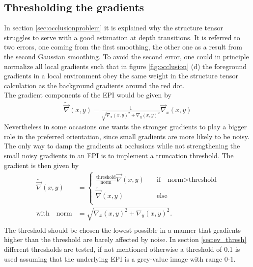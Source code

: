 \documentclass  [
  paper    = a4,
  BCOR     = 10mm,
  twoside,
  fontsize = 12pt,
  fleqn,
  toc      = bibnumbered,
  toc      = listofnumbered,
  numbers  = noendperiod,
  headings = normal,
  listof   = leveldown,
  version  = 3.03
]                                       {scrreprt}
\begin{document}
 \subsection{Thresholding the gradients}
 \label{sec:thresholdinggradients}
 In section \ref{sec:occlusionproblem} it is explained why the structure tensor struggles to serve with a  good estimation at depth transitions. It is referred to two errors, one coming from the first smoothing, the other one as a result from the second Gaussian smoothing. To avoid the second error, one could in principle normalize all local gradients such that in figure \ref{fig:occlusion} (d) the foreground gradients in a local environment obey the same weight in the structure tensor calculation as the background gradients around the red dot.\\
 The gradient components of the EPI would be given by
 \begin{align}
 	\tilde{\vec \nabla}(x,y) = \frac{1}{\sqrt{\nabla_x(x,y)^2 + \nabla_y(x,y)^2}} \vec \nabla_x(x,y)
 \end{align}
 Nevertheless in some occasions one wants the stronger gradients to play a bigger role in the preferred orientation, since small gradients are more likely to be noisy. The only way to damp the gradients at occlusions while not strengthening the small noisy gradients in an EPI is to implement a truncation threshold. The gradient is then given by
 \begin{align}
 \tilde{\vec \nabla}(x,y) &= \begin{cases}
\frac{\text{threshold}}{\text{norm}} \vec \nabla(x,y) \quad &\text{if}\quad \text{norm}> \text{threshold}\\
\tilde{\vec \nabla}(x,y)\qquad &\text{else}\\
 \end{cases} \\
\text{with} \quad \text{norm} &= \sqrt{\nabla_x(x,y)^2 + \nabla_y(x,y)^2}.\\
 \end{align}
 The threshold should be chosen the lowest possible in a manner that gradients higher than the threshold are barely affected by noise. In section \ref{sec:ev_thresh} different thresholds are tested, if not mentioned otherwise a threshold of 0.1 is used assuming that the underlying EPI is a grey-value image with range 0-1.\\
 
\end{document}
